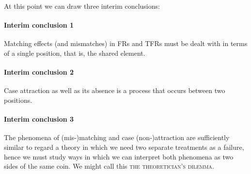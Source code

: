 \documentclass[output=paper]{langsci/langscibook}
\begin{document}
\begin{refcontext}
\z

At this point we can draw three interim conclusions:

\paragraph*{Interim conclusion 1} Matching effects (and mismatches) in
\glspl{FR} and \glspl{TFR} must be dealt with in terms of a single position,
that is, the shared element.

\paragraph*{Interim conclusion 2} Case attraction as well as its absence is a
process that occurs between two positions.

\paragraph*{Interim conclusion 3} The phenomena of (mis-)matching and case
(non-)at\-trac\-tion are sufficiently similar to regard a theory in which we
need two separate treatments as a failure, hence we must study ways in which we
can interpret both phenomena as two sides of the same coin. We might call this
\textsc{the theoretician's dilemma}.


\end{refcontext}
\end{document}
